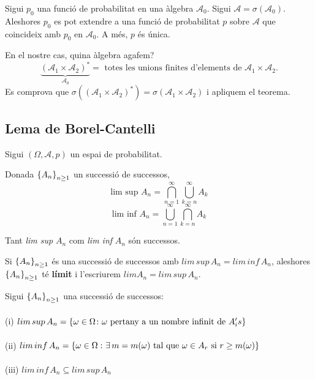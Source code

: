 \begin{thm}
  Sigui $p_{0}$ una funció de probabilitat en una àlgebra $\mathcal{A}_{0}$. 
  Sigui $\mathcal{A} = \sigma(\mathcal{A}_{0})$. \\
  Aleshores $p_{0}$ es pot extendre a una funció de probabilitat $p$ sobre $\mathcal{A}$ que 
  coincideix amb $p_{0}$ en $\mathcal{A}_{0}$. A més, $p$ és única.
\end{thm}

En el nostre cas, quina àlgebra agafem? 
\[
    \underbrace{(\mathcal{A}_{1}\times\mathcal{A}_{2})^{*}}_{\mathcal{A}_{0}} = \text{ totes 
    les unions finites d'elements de } \mathcal{A}_{1}\times\mathcal{A}_{2}.
\]
Es comprova que $\sigma((\mathcal{A}_{1}\times\mathcal{A}_{2})^{*}) = \sigma(\mathcal{A}_{1}\times\mathcal{A}_{2})$ 
i apliquem el teorema.

\subsection{Lema de Borel-Cantelli}

Sigui $(\Omega, \mathcal{A}, p)$ un espai de probabilitat.

\begin{defi}
  Donada $\left\{A_{n}\right\}_{n\geq 1}$ un successió de successos, 
  \[
    \text{lim sup } A_{n} = \bigcap\limits_{n=1}^{\infty}\bigcup\limits_{k=n}^{\infty}A_{k}
  \]
  \[
    \text{lim inf } A_{n} = \bigcup\limits_{n=1}^{\infty}\bigcap\limits_{k=n}^{\infty}A_{k}
  \]
\end{defi}

\begin{obs}
  Tant \textit{lim sup} $A_{n}$ com \textit{lim inf} $A_{n}$ són successos.
\end{obs}

\begin{defi}
  Si $\left\{A_{n}\right\}_{n\geq 1}$ és una successió de successos amb $lim \, sup\, A_{n} = lim\, inf\, A_{n}$, 
  aleshores $\left\{A_{n}\right\}_{n\geq 1}$ té \textbf{límit} i l'escriurem $lim A_{n} = lim \, sup \, A_{n}$.
\end{defi}


\begin{properties}
  Sigui $\left\{A_{n}\right\}_{n\geq 1}$ una successió de successos: \\\\
  (i) $lim \, sup \, A_{n} = \left\{\omega \in \Omega \colon \omega \text{ pertany a un nombre 
  infinit de } A_{i}'s\right\}$ \\\\
  (ii) $lim \, inf \, A_{n} = \left\{\omega \in \Omega\, \colon \exists \, m = m(\omega) 
  \text{ tal que } \omega\in A_{r} \text{ si } r \geq m(\omega)\right\}$ \\\\
  (iii) $lim \, inf\, A_{n} \subseteq lim\, sup \, A_{n}$ \\
\end{properties}


